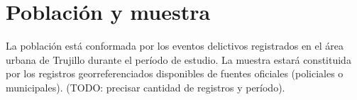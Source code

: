 
\section{Población y muestra}

\label{sec:poblacion}

La población está conformada por los eventos delictivos registrados
en el área urbana de Trujillo durante el período de estudio. La muestra
estará constituida por los registros georreferenciados disponibles
de fuentes oficiales (policiales o municipales). (TODO: precisar cantidad
de registros y período).
